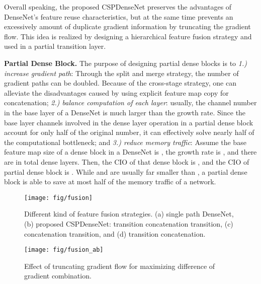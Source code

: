 \documentclass{article}
\begin{document}
Overall speaking, the proposed CSPDenseNet preserves the advantages of DenseNet's feature reuse characteristics, but at the same time prevents an excessively amount of duplicate gradient information by truncating the gradient flow.  This idea is realized by designing a hierarchical feature fusion strategy and used in a partial transition layer.

{\bf Partial Dense Block.} The purpose of designing partial dense blocks is to \textit{1.) increase gradient path}: Through the split and merge strategy, the number of gradient paths can be doubled.  Because of the cross-stage strategy, one can alleviate the disadvantages caused by using explicit feature map copy for concatenation; \textit{2.) balance computation of each layer}: usually, the channel number in the base layer of a DenseNet is much larger than the growth rate.  Since the base layer channels involved in the dense layer operation in a partial dense block account for only half of the original number, it can effectively solve nearly half of the computational bottleneck; and \textit{3.) reduce memory traffic}: Assume the base feature map size of a dense block in a DenseNet is , the growth rate is , and there are in total  dense layers.  Then, the CIO of that dense block is , and the CIO of partial dense block is .  While  and  are usually far smaller than , a partial dense block is able to save at most half of the memory traffic of a network.

\begin{figure}[h]
	\begin{center}
		\texttt{[image: fig/fusion]}
	\end{center}
	\caption{Different kind of feature fusion strategies.  (a) single path DenseNet, (b) proposed CSPDenseNet: transition  concatenation  transition, (c) concatenation  transition, and (d) transition  concatenation.  }
	\label{fig:fusion}
\end{figure}

\begin{figure}[h]
	\begin{center}
		\texttt{[image: fig/fusion\_ab]}
	\end{center}
	\caption{Effect of truncating gradient flow for maximizing difference of gradient combination.  }
	\label{fig:fusion_ab}
\end{figure}
\end{document}
